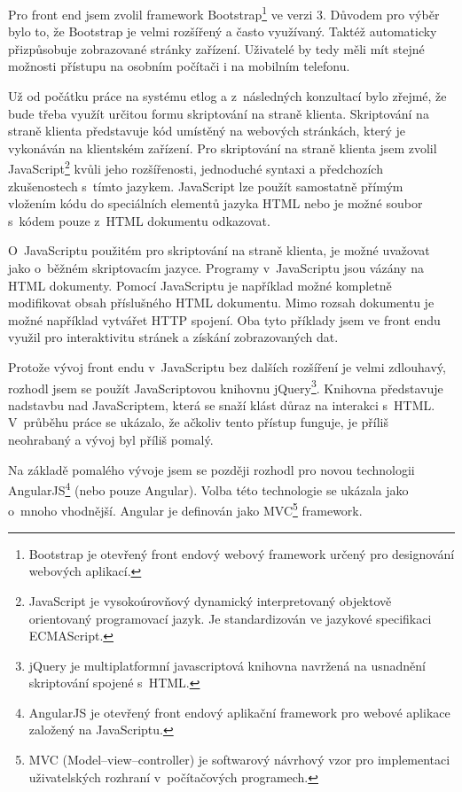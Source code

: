 \documentclass[thesis=M,czech]{FITthesis}[2012/06/26]
\begin{document}
      Pro front end jsem zvolil framework Bootstrap\footnote{
        Bootstrap je otevřený front endový webový framework určený pro designování webových aplikací.  
      }
      ve verzi 3.
      Důvodem pro výběr bylo to, že Bootstrap je velmi rozšířený a často využívaný.
      Taktéž automaticky přizpůsobuje zobrazované stránky zařízení.
      Uživatelé by tedy měli mít stejné možnosti přístupu na osobním počítači i na mobilním telefonu.

      Už od počátku práce na systému etlog a z~následných konzultací bylo zřejmé,
      že bude třeba využít určitou formu skriptování na straně klienta.
      Skriptování na straně klienta představuje kód umístěný na webových stránkách, 
      který je vykonáván na klientském zařízení.
      Pro skriptování na straně klienta jsem zvolil JavaScript\footnote{
        JavaScript je vysokoúrovňový dynamický interpretovaný objektově orientovaný programovací jazyk.
        Je standardizován ve jazykové specifikaci ECMAScript.
      }
      kvůli jeho rozšířenosti, jednoduché syntaxi a předchozích zkušenostech s~tímto jazykem.
      JavaScript lze použít samostatně přímým vložením kódu do
      speciálních elementů jazyka HTML nebo je možné soubor s~kódem pouze z~HTML dokumentu odkazovat.

      O~JavaScriptu použitém pro skriptování na straně klienta, 
      je možné uvažovat jako o~běžném skriptovacím jazyce.
      Programy v~JavaScriptu jsou vázány na HTML dokumenty.
      Pomocí JavaScriptu je například možné kompletně modifikovat obsah příslušného HTML dokumentu.
      Mimo rozsah dokumentu je možné například vytvářet HTTP spojení.
      Oba tyto příklady jsem ve front endu využil pro interaktivitu stránek a získání zobrazovaných dat.

      Protože vývoj front endu v~JavaScriptu bez dalších rozšíření je velmi zdlouhavý,
      rozhodl jsem se použít JavaScriptovou knihovnu jQuery\footnote{
        jQuery je multiplatformní javascriptová knihovna navržená na usnadnění skriptování spojené s~HTML.
      }.
      Knihovna představuje nadstavbu nad JavaScriptem,
      která se snaží klást důraz na interakci s~HTML.
      V~průběhu práce se ukázalo, že ačkoliv tento přístup funguje,
      je příliš neohrabaný a vývoj byl příliš pomalý.

      Na základě pomalého vývoje jsem se později rozhodl pro novou technologii AngularJS\footnote{
        AngularJS je otevřený front endový aplikační framework pro webové aplikace založený na JavaScriptu.
      }
      (nebo pouze Angular).
      Volba této technologie se ukázala jako o~mnoho vhodnější.
      Angular je definován jako MVC\footnote{
        MVC (Model--view--controller) je softwarový návrhový vzor pro implementaci uživatelských rozhraní v~počítačových programech.
      }
      framework.
      
\end{document}
